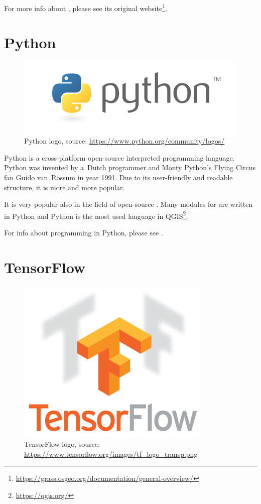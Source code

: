 For more info about  , please see its original 
website\footnote{\url{https://grass.osgeo.org/documentation/general-overview/}}.

\section{Python}
\label{python}

\begin{figure}[H]
   \centering
	\includegraphics[width=\linewidth]{./pictures/python-logo.png}
	\caption[Python logo]{Python logo, source: \url{https://www.python.org/community/logos/}}
      \label{fig:python-logo}
\end{figure}

Python is a cross-platform open-source interpreted programming language. Python 
was invented by a~Dutch programmer and Monty Python's Flying Circus fan Guido 
van~Rossum in year 1991. Due to its user-friendly and readable structure, it is 
more and more popular.

It is very popular also in the field of open-source . Many modules for 
  are written in Python and Python is the most used language 
in QGIS\footnote{\url{https://qgis.org/}}.

For info about programming in Python, please see \cite{diveintopython}.

\section{TensorFlow}
\label{tf}

\begin{figure}[H]
   \centering
	\includegraphics[scale=0.5]{./pictures/tf-logo.png}
	\caption[TensorFlow logo]{TensorFlow logo, source: \url{https://www.tensorflow.org/images/tf_logo_transp.png}}
      \label{fig:tf-logo}
\end{figure}

